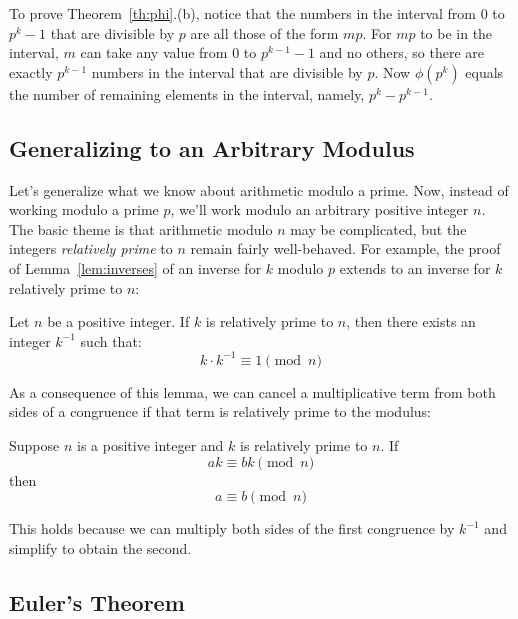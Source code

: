 To prove Theorem~\ref{th:phi}.(b), notice that the numbers in the interval
from 0 to $p^{k}-1$ that are divisible by $p$ are all those of the form
$mp$.  For $mp$ to be in the interval, $m$ can take any value from 0 to
$p^{k-1}-1$ and no others, so there are exactly $p^{k-1}$ numbers in the
interval that are divisible by $p$.  Now $\phi(p^{k})$ equals the number
of remaining elements in the interval, namely, $p^k -p^{k-1}$.


\subsection{Generalizing to an Arbitrary Modulus}

Let's generalize what we know about arithmetic modulo a prime.  Now,
instead of working modulo a prime $p$, we'll work modulo an arbitrary
positive integer $n$.  The basic theme is that arithmetic modulo $n$ may
be complicated, but the integers {\em relatively prime} to $n$ remain
fairly well-behaved.  For example, the proof of Lemma~\ref{lem:inverses}
of an inverse for $k$ modulo $p$ extends to an inverse for $k$ relatively
prime to $n$:

\begin{lemma}
\label{lem:inverse-arb}
Let $n$ be a positive integer.  If $k$ is relatively prime to $n$,
then there exists an integer $k^{-1}$ such that:
%
\[
k \cdot k^{-1} \equiv 1 \pmod{n}
\]
\end{lemma}

As a consequence of this lemma, we can cancel a multiplicative term
from both sides of a congruence if that term is relatively prime to
the modulus:

\begin{corollary}
\label{cor:cancellation-arb}
Suppose $n$ is a positive integer and $k$ is relatively prime to $n$.
If
%
\[
a k \equiv b k \pmod{n}
\]
%
then
%
\[
a \equiv b \pmod{n}
\]
\end{corollary}

This holds because we can multiply both sides of the first congruence
by $k^{-1}$ and simplify to obtain the second.

\subsection{Euler's Theorem}

